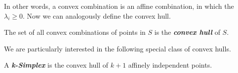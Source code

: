 In other words, a convex combination is an affine combination, in which the $\lambda_i \geq 0$. Now we can analogously define the convex hull.

\begin{defi}
The set of all convex combinations of points in $S$ is the \textbf{\textit{convex hull}} of $S$. 
\end{defi} 

We are particularly interested in the following special class of convex hulls.

\begin{defi}[k-Simplex]
A \textit{\textbf{k-Simplex}} is the convex hull of $k+1$ affinely independent points. 
\end{defi}